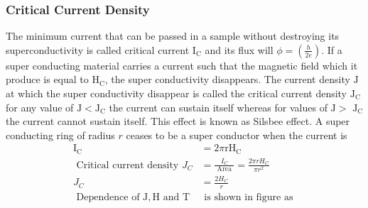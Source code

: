 \subsubsection{Critical Current Density}
The minimum current that can be passed in a sample without destroying its superconductivity is called critical current $\mathrm{I}_{\mathrm{C}}$ and its flux will $\phi=\left(\frac{h}{2 e}\right)$. If a super conducting material carries a current such that the magnetic field which it produce is equal to $\mathrm{H}_{\mathrm{C}}$, the super conductivity disappears. The current density $\mathrm{J}$ at which the super conductivity disappear is called the critical current density $\mathrm{J}_{\mathrm{C}}$ for any value of $\mathrm{J}<\mathrm{J}_{\mathrm{C}}$ the current can sustain itself whereas for values of $\mathrm{J}>$ $\mathrm{J}_{\mathrm{C}}$ the current cannot sustain itself. This effect is known as Silsbee effect.
A super conducting ring of radius $r$ ceases to be a super conductor when the current is
\begin{align*}
\mathrm{I}_{\mathrm{C}}&=2 \pi \mathrm{rH}_{\mathrm{C}}\\
\text { Critical current density } J_{C}&=\frac{I_{C}}{\text { Area }}=\frac{2 \pi r H_{C}}{\pi r^{2}}\\
J_{C}&=\frac{2 H_{C}}{r}\\
\text { Dependence of } \mathrm{J}, \mathrm{H} \text { and } \mathrm{T} &\text { is shown in figure as }
\end{align*}
